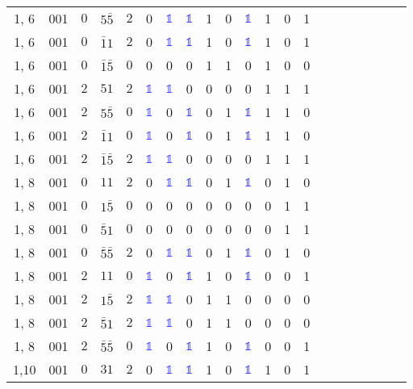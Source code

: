 \begin{longtable*}{c| cccccccccccccccccccc }
1, 6& 001& $0$& $5\bar{5}$& $2$& 0& \textcolor{blue}{$\mathds{1}$}& \textcolor{blue}{$\mathds{1}$}& 1& 0& \textcolor{blue}{$\mathds{1}$}& 1& 0& 1\\
1, 6& 001& $0$& $\bar{1}1$& $2$& 0& \textcolor{blue}{$\mathds{1}$}& \textcolor{blue}{$\mathds{1}$}& 1& 0& \textcolor{blue}{$\mathds{1}$}& 1& 0& 1\\
1, 6& 001& $0$& $\bar{1}\bar{5}$& $0$& 0& 0& 0& 1& 1& 0& 1& 0& 0\\
1, 6& 001& $2$& $51$& $2$& \textcolor{blue}{$\mathds{1}$}& \textcolor{blue}{$\mathds{1}$}& 0& 0& 0& 0& 1& 1& 1\\
1, 6& 001& $2$& $5\bar{5}$& $0$& \textcolor{blue}{$\mathds{1}$}& 0& \textcolor{blue}{$\mathds{1}$}& 0& 1& \textcolor{blue}{$\mathds{1}$}& 1& 1& 0\\
1, 6& 001& $2$& $\bar{1}1$& $0$& \textcolor{blue}{$\mathds{1}$}& 0& \textcolor{blue}{$\mathds{1}$}& 0& 1& \textcolor{blue}{$\mathds{1}$}& 1& 1& 0\\
1, 6& 001& $2$& $\bar{1}\bar{5}$& $2$& \textcolor{blue}{$\mathds{1}$}& \textcolor{blue}{$\mathds{1}$}& 0& 0& 0& 0& 1& 1& 1\\
1, 8& 001& $0$& $11$& $2$& 0& \textcolor{blue}{$\mathds{1}$}& \textcolor{blue}{$\mathds{1}$}& 0& 1& \textcolor{blue}{$\mathds{1}$}& 0& 1& 0\\
1, 8& 001& $0$& $1\bar{5}$& $0$& 0& 0& 0& 0& 0& 0& 0& 1& 1\\
1, 8& 001& $0$& $\bar{5}1$& $0$& 0& 0& 0& 0& 0& 0& 0& 1& 1\\
1, 8& 001& $0$& $\bar{5}\bar{5}$& $2$& 0& \textcolor{blue}{$\mathds{1}$}& \textcolor{blue}{$\mathds{1}$}& 0& 1& \textcolor{blue}{$\mathds{1}$}& 0& 1& 0\\
1, 8& 001& $2$& $11$& $0$& \textcolor{blue}{$\mathds{1}$}& 0& \textcolor{blue}{$\mathds{1}$}& 1& 0& \textcolor{blue}{$\mathds{1}$}& 0& 0& 1\\
1, 8& 001& $2$& $1\bar{5}$& $2$& \textcolor{blue}{$\mathds{1}$}& \textcolor{blue}{$\mathds{1}$}& 0& 1& 1& 0& 0& 0& 0\\
1, 8& 001& $2$& $\bar{5}1$& $2$& \textcolor{blue}{$\mathds{1}$}& \textcolor{blue}{$\mathds{1}$}& 0& 1& 1& 0& 0& 0& 0\\
1, 8& 001& $2$& $\bar{5}\bar{5}$& $0$& \textcolor{blue}{$\mathds{1}$}& 0& \textcolor{blue}{$\mathds{1}$}& 1& 0& \textcolor{blue}{$\mathds{1}$}& 0& 0& 1\\
1,10& 001& $0$& $31$& $2$& 0& \textcolor{blue}{$\mathds{1}$}& \textcolor{blue}{$\mathds{1}$}& 1& 0& \textcolor{blue}{$\mathds{1}$}& 1& 0& 1\\

\end{longtable*}
